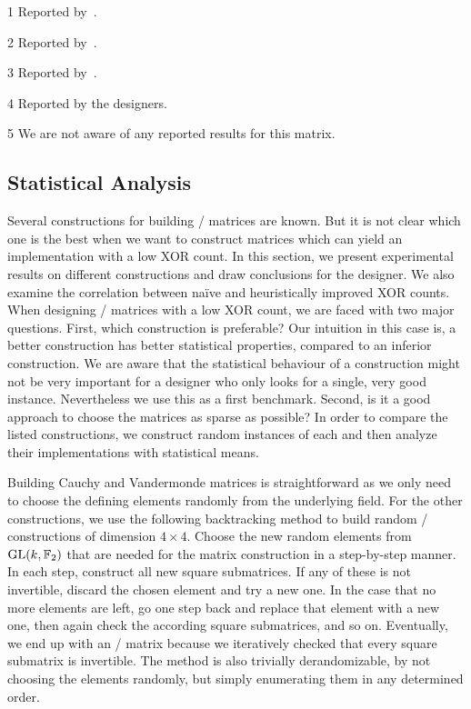 \begin{fullwidth}
\begin{table}
\begin{threeparttable}
\begin{tablenotes}
        \vspace{0.75em}
    \item[1] Reported by~.
    \item[2] Reported by~.
    \item[3] Reported by~.
    \item[4] Reported by the designers.
    \item[5] We are not aware of any reported results for this matrix.
    \end{tablenotes}
    \end{threeparttable}
\end{table}
\end{fullwidth}

\subsection{Statistical Analysis}
\label{slps:sec:comparison}
Several constructions for building \MDS/ matrices are known.
But it is not clear which one is the best when we want to construct matrices which can yield an implementation with a low XOR count.
In this section, we present experimental results on different constructions and draw conclusions for the designer.
We also examine the correlation between na\"ive and heuristically improved XOR counts.
When designing \MDS/ matrices with a low XOR count, we are faced with two major questions.
First, which construction is preferable?
Our intuition in this case is, a better construction has better statistical properties, compared to an inferior construction.
We are aware that the statistical behaviour of a construction might not be very important for a designer who only looks for a single, very good instance.
Nevertheless we use this as a first benchmark.
Second, is it a good approach to choose the matrices as sparse as possible?
In order to compare the listed constructions, we construct random instances of each and then analyze their implementations with statistical means.

Building Cauchy and Vandermonde matrices is straightforward as we only need to choose the defining elements randomly from the underlying field.
For the other constructions, we use the following backtracking method to build random \MDS/ constructions of dimension $4 \times 4$.
Choose the new random elements from $\mathrm{GL}(k, \mathbb{F}_2)$ that are needed for the matrix construction in a step-by-step manner.
In each step, construct all new square submatrices. If any of these is not invertible, discard the chosen element and try a new one. In the case that no more elements are left, go one step back and replace that element with a new one, then again check the according square submatrices, and so on.
Eventually, we end up with an \MDS/ matrix because we iteratively checked that every square submatrix is invertible.
The method is also trivially derandomizable, by not choosing the elements randomly, but simply enumerating them in any determined order.


